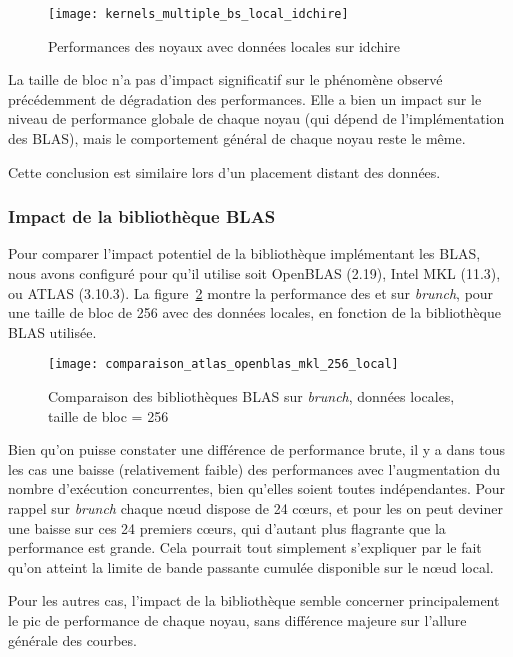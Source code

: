 \begin{figure}[ht]
  \centering
  \texttt{[image: kernels\_multiple\_bs\_local\_idchire]}
  \caption{Performances des noyaux avec données locales sur idchire}\label{fig:contribs:apps:cholesky:perf-multiple-bs-idchire}
\end{figure}

La taille de bloc n'a pas d'impact significatif sur le phénomène observé précédemment de dégradation des performances.
Elle a bien un impact sur le niveau de performance globale de chaque noyau (qui dépend de l'implémentation des BLAS), mais le comportement général de chaque noyau reste le même.

Cette conclusion est similaire lors d'un placement distant des données.


\subsubsection{Impact de la bibliothèque BLAS}

Pour comparer l'impact potentiel de la bibliothèque implémentant les BLAS, nous avons configuré \outil pour qu'il utilise soit OpenBLAS (2.19), Intel MKL (11.3), ou ATLAS (3.10.3).
La figure~\ref{fig:contribs:apps:cholesky:perf-blas} montre la performance des \gemm et \potrf sur \emph{brunch}, pour une taille de bloc de 256 avec des données locales, en fonction de la bibliothèque BLAS utilisée.

\begin{figure}[ht]
  \centering
  \texttt{[image: comparaison\_atlas\_openblas\_mkl\_256\_local]}
  \caption{Comparaison des bibliothèques BLAS sur \emph{brunch}, données locales, taille de bloc = 256}\label{fig:contribs:apps:cholesky:perf-blas}
\end{figure}

Bien qu'on puisse constater une différence de performance brute, il y a dans tous les cas une baisse (relativement faible) des performances avec l'augmentation du nombre d'exécution concurrentes, bien qu'elles soient toutes indépendantes.
Pour rappel sur \emph{brunch} chaque nœud dispose de 24 cœurs, et pour les \gemm on peut deviner une baisse sur ces 24 premiers cœurs, qui d'autant plus flagrante que la performance est grande.
Cela pourrait tout simplement s'expliquer par le fait qu'on atteint la limite de bande passante cumulée disponible sur le nœud local.

Pour les autres cas, l'impact de la bibliothèque semble concerner principalement le pic de performance de chaque noyau, sans différence majeure sur l'allure générale des courbes.
